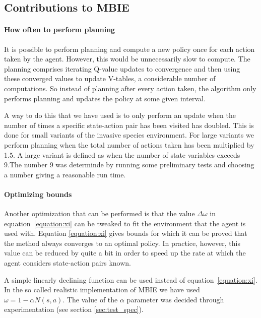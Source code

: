 \subsection{Contributions to MBIE}
\label{sec:MBIE_our_contribution}

\paragraph{How often to perform planning}
\label{sec:mbie_perform_planning}

It is possible to perform planning and compute a new policy once for each
action taken by the agent. However, this would be unnecessarily slow to
compute. The planning comprises iterating Q-value updates to convergence and
then using these converged values to update V-tables, a considerable number of
computations. So instead of planning after every action taken, the algorithm
only performs planning and updates the policy at some given interval. 

A way to do this that we have used is to only perform an update when the
number of times a specific state-action pair has been visited has doubled. This is done for small variants of the invasive species environment. For
large variants we perform planning when
the total number of actions taken has been multiplied by 1.5. A large variant is defined as when the number of state variables exceeds 9.The number 9 was determinde by running some preliminary tests and choosing a number giving a reasonable run time.

\paragraph{Optimizing bounds} Another optimization that can be performed is that the value $\Delta \omega$ in
equation~\eqref{equation:xi} can be tweaked to fit the environment that the agent
is used with. Equation \eqref{equation:xi} gives bounds for which it can be
proved that the method always converges to an optimal policy. In practice,
however, this value can be reduced by quite a bit in order to speed up the rate
at which the agent considers state-action pairs known. 

A simple linearly declining function can be used instead of
equation~\eqref{equation:xi}. In the so called realistic implementation of MBIE we have
used $\omega = 1 - \alpha N(s,a).$ The value of the $\alpha$ parameter was decided through experimentation (see section \ref{sec:test_spec}).

